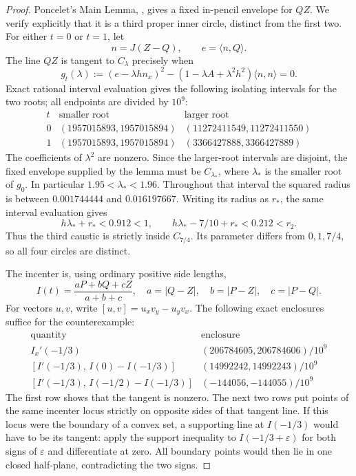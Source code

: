 \documentclass[11pt]{article}
\newcommand{\dotp}[2]{\langle #1,#2\rangle}
\begin{document}
\begin{proof}
Poncelet's Main Lemma, \cite[Lemma 1]{source}, gives a fixed
in-pencil envelope for $QZ$. We verify explicitly that it is a
third proper inner circle, distinct from the first two.
For either $t=0$ or $t=1$, let
\[
 n=J(Z-Q),\qquad e=\dotp{n}{Q}.
\]
The line $QZ$ is tangent to $C_\lambda$ precisely when
\begin{equation}
 g_t(\lambda):=(e-\lambda h n_x)^2-
 (1-\lambda A+\lambda^2h^2)\dotp{n}{n}=0. \label{eq:g}
\end{equation}
Exact rational interval evaluation gives the following isolating
intervals for the two roots; all endpoints are divided by $10^9$:
\[
\begin{array}{c|cc}
t&\text{smaller root}&\text{larger root}\\ \hline
0&(1957015893,1957015894)&(11272411549,11272411550)\\
1&(1957015893,1957015894)&(3366427888,3366427889)
\end{array}
\]
The coefficients of $\lambda^2$ are nonzero. Since the larger-root
intervals are disjoint, the fixed envelope supplied by the lemma must
be $C_{\lambda_*}$, where $\lambda_*$ is the smaller root of $g_0$.
In particular $1.95<\lambda_*<1.96$. Throughout that interval the
squared radius is between $0.001744444$ and $0.016197667$.
Writing its radius as $r_*$, the same interval evaluation gives
\[
 h\lambda_*+r_*<0.912<1,\qquad
 h\lambda_*-7/10+r_*<0.212<r_2.
\]
Thus the third caustic is strictly inside $C_{7/4}$.
Its parameter differs from $0,1,7/4$, so all four circles are distinct.

The incenter is, using ordinary positive side lengths,
\begin{equation}
 I(t)=\frac{aP+bQ+cZ}{a+b+c},\quad
 a=|Q-Z|,\quad b=|P-Z|,\quad c=|P-Q|. \label{eq:I}
\end{equation}
For vectors $u,v$, write $[u,v]=u_xv_y-u_yv_x$.
The following exact enclosures suffice for the counterexample:
\[
\begin{array}{c|c}
\text{quantity}&\text{enclosure}\\ \hline
I_x'(-1/3)&(206784605,206784606)/10^9\\
{}[I'(-1/3),\,I(0)-I(-1/3)]&(14992242,14992243)/10^9\\
{}[I'(-1/3),\,I(-1/2)-I(-1/3)]&(-144056,-144055)/10^9
\end{array}
\]
The first row shows that the tangent is nonzero. The next two rows
put points of the same incenter locus strictly on opposite sides of
that tangent line. If this locus were the boundary of a convex set,
a supporting line at $I(-1/3)$ would have to be its tangent: apply the
support inequality to $I(-1/3+\varepsilon)$ for both signs of
$\varepsilon$ and differentiate at zero. All boundary points would
then lie in one closed half-plane, contradicting the two signs.


\end{proof}
\end{document}
